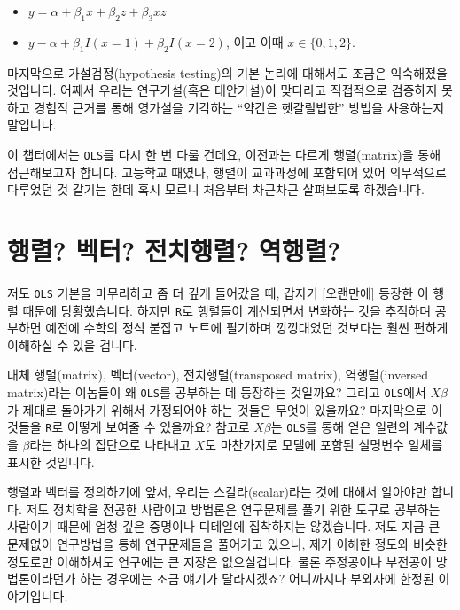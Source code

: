 \documentclass[
]{book}
\begin{document}
\begin{itemize}
\item
  \(y = \alpha + \beta_1x + \beta_2z + \beta_3xz\)
\item
  \(y - \alpha + \beta_1I(x = 1) + \beta_2I(x = 2)\), 이고 이때 \(x \in\{0,1,2\}\).
\end{itemize}

마지막으로 가설검정(hypothesis testing)의 기본 논리에 대해서도 조금은 익숙해졌을 것입니다. 어째서 우리는 연구가설(혹은 대안가설)이 맞다라고 직접적으로 검증하지 못하고 경험적 근거를 통해 영가설을 기각하는 ``약간은 헷갈릴법한'' 방법을 사용하는지 말입니다.

이 챕터에서는 \texttt{OLS}를 다시 한 번 다룰 건데요, 이전과는 다르게 행렬(matrix)을 통해 접근해보고자 합니다. 고등학교 때였나, 행렬이 교과과정에 포함되어 있어 의무적으로 다루었던 것 같기는 한데 혹시 모르니 처음부터 차근차근 살펴보도록 하겠습니다.

\hypertarget{uxd589uxb82c-uxbca1uxd130-uxc804uxce58uxd589uxb82c-uxc5eduxd589uxb82c}{%
\section{행렬? 벡터? 전치행렬? 역행렬?}\label{uxd589uxb82c-uxbca1uxd130-uxc804uxce58uxd589uxb82c-uxc5eduxd589uxb82c}}

저도 \texttt{OLS} 기본을 마무리하고 좀 더 깊게 들어갔을 때, 갑자기 {[}오랜만에{]} 등장한 이 행렬 때문에 당황했습니다. 하지만 \texttt{R}로 행렬들이 계산되면서 변화하는 것을 추적하며 공부하면 예전에 수학의 정석 붙잡고 노트에 필기하며 낑낑대었던 것보다는 훨씬 편하게 이해하실 수 있을 겁니다.

대체 행렬(matrix), 벡터(vector), 전치행렬(transposed matrix), 역행렬(inversed matrix)라는 이놈들이 왜 \texttt{OLS}를 공부하는 데 등장하는 것일까요? 그리고 \texttt{OLS}에서 \(X\beta\)가 제대로 돌아가기 위해서 가정되어야 하는 것들은 무엇이 있을까요? 마지막으로 이것들을 \texttt{R}로 어떻게 보여줄 수 있을까요? 참고로 \(X\beta\)는 \texttt{OLS}를 통해 얻은 일련의 계수값을 \(\beta\)라는 하나의 집단으로 나타내고 \(X\)도 마찬가지로 모델에 포함된 설명변수 일체를 표시한 것입니다.

행렬과 벡터를 정의하기에 앞서, 우리는 스칼라(scalar)라는 것에 대해서 알아야만 합니다. 저도 정치학을 전공한 사람이고 방법론은 연구문제를 풀기 위한 도구로 공부하는 사람이기 때문에 엄청 깊은 증명이나 디테일에 집착하지는 않겠습니다. 저도 지금 큰 문제없이 연구방법을 통해 연구문제들을 풀어가고 있으니, 제가 이해한 정도와 비슷한 정도로만 이해하셔도 연구에는 큰 지장은 없으실겁니다. 물론 주정공이나 부전공이 방법론이라던가 하는 경우에는 조금 얘기가 달라지겠죠? 어디까지나 부외자에 한정된 이야기입니다.
\end{document}
